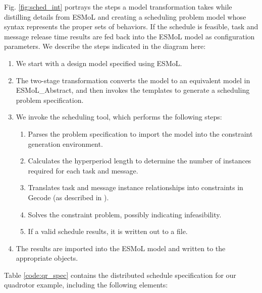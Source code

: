 Fig. \ref{fig:sched_int} portrays the steps a 
model transformation takes while distilling details from ESMoL and 
creating a scheduling problem model whose 
syntax represents the proper sets of behaviors.  If the
schedule is feasible, task and message release 
time results are fed back into the ESMoL model 
as configuration parameters.  We describe the steps
indicated in the diagram here:

\begin{enumerate}
 \item We start with a design model specified using ESMoL.
 \item The two-stage transformation converts the model to an equivalent model in ESMoL\_Abstract, and then invokes the templates to generate a scheduling problem specification.
 \item We invoke the scheduling tool, which performs the following steps:
 
 \begin{enumerate}
 \item Parses the problem specification to import the model into the constraint generation environment.
 \item Calculates the hyperperiod length to determine the number of instances required for each task and message.
 \item Translates task and message instance relationships into constraints in Gecode (as described in \cite{sched:analysis}).
 \item Solves the constraint problem, possibly indicating infeasibility.  
 \item If a valid schedule results, it is written out to a file.
 \end{enumerate}
 \item The results are imported into the ESMoL model and written to the appropriate objects.
\end{enumerate}

Table \ref{code:qr_spec} contains the distributed schedule 
specification for our quadrotor example, including the following elements:

